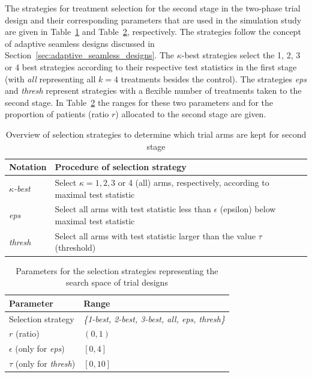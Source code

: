 \documentclass[bimj,fleqn]{w-art}
\theoremstyle{plain}
\theoremstyle{definition}
\begin{document}
The strategies for treatment selection for the second stage in the two-phase trial design and their corresponding parameters that are used in the simulation study are given in Table~\ref{tab:selection_strategies} and Table~\ref{tab:search_space}, respectively.
The strategies follow the concept of adaptive seamless designs discussed in Section~\ref{sec:adaptive_seamless_designs}. 
The $\kappa$-best strategies select the  1, 2, 3 or 4 best strategies according to their respective test statistics in the first stage (with \emph{all} representing all $k=4$ treatments besides the control). 
The strategies \emph{eps} and \emph{thresh} represent strategies with a flexible number of treatments taken to the second stage. 
In Table~\ref{tab:search_space} the ranges for these two parameters and for the proportion of patients (ratio $r$) allocated to the second stage are given.
\begin{table}[h]
  \caption{Overview of selection strategies to determine which trial arms are kept for second stage}
  \label{tab:selection_strategies}
  \centering
  \begin{tabular}{ll}
  \hline
  Notation       & Procedure of selection strategy  \\
  \hline
  \emph{$\kappa$-best}    & Select $\kappa = 1, 2, 3$ or 4 (all) arms, respectively, according to maximal test statistic \\
  \emph{eps}     & Select all arms with test statistic less than $\epsilon$ (epsilon) below maximal test statistic \\
  \emph{thresh}  & Select all arms with test statistic larger than the value $\tau$ (threshold) \\
  \hline
  \end{tabular}
\end{table}
\begin{table}[h]
  \caption{Parameters for the selection strategies representing the search space of trial designs}
  \label{tab:search_space}
  \centering
  \begin{tabular}{ll}
  \hline
  Parameter                        & Range \\
  \hline
  Selection strategy               & \emph{\{1-best, 2-best, 3-best, all, eps, thresh\}} \\
  $r$ (ratio)                      & $(0,1)$ \\
  $\epsilon$ (only for \emph{eps}) & $[0,4]$ \\
  $\tau$ (only for \emph{thresh})  & $[0,10]$ \\
  \hline
  \end{tabular}
\end{table}
\end{document}
